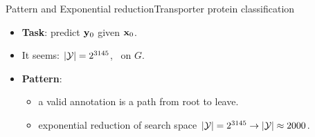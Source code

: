 \documentclass[first=dgreen,second=purple,logo=red]{aaltoslides}
\begin{document}
\begin{frame}{Pattern  and Exponential reduction}{Transporter protein classification \cite{su2015transporter}}
\begin{itemize}
\begin{center}
		\end{center}
		\item {\bf Task}: predict $\mathbf {y}_0$ given $\mathbf {x}_0$.
		\item It seems: $|\mathcal{Y}| = 2^{3145}$, \dpg\ on $G$.
		\item {\bf Pattern}:
		\begin{itemize}\footnotesize
			\item a valid annotation is a path from root to leave.
			\item exponential reduction of search space $|\mathcal{Y}| = 2^{3145}\rightarrow|\mathcal{Y}|\approx 2000$.
		\end{itemize}
	\end{itemize}
\end{frame}
\end{document}
